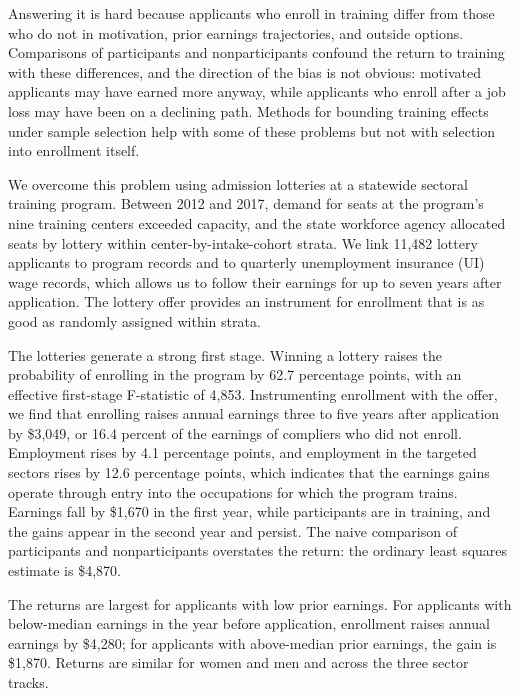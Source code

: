 \documentclass[12pt]{article}
\begin{document}
Answering it is hard because applicants who enroll in training differ from those who do not in motivation, prior earnings trajectories, and outside options. Comparisons of participants and nonparticipants confound the return to training with these differences, and the direction of the bias is not obvious: motivated applicants may have earned more anyway, while applicants who enroll after a job loss may have been on a declining path. Methods for bounding training effects under sample selection \citep{lee2009} help with some of these problems but not with selection into enrollment itself.

We overcome this problem using admission lotteries at a statewide sectoral training program. Between 2012 and 2017, demand for seats at the program's nine training centers exceeded capacity, and the state workforce agency allocated seats by lottery within center-by-intake-cohort strata. We link 11,482 lottery applicants to program records and to quarterly unemployment insurance (UI) wage records, which allows us to follow their earnings for up to seven years after application. The lottery offer provides an instrument for enrollment that is as good as randomly assigned within strata.

The lotteries generate a strong first stage. Winning a lottery raises the probability of enrolling in the program by 62.7 percentage points, with an effective first-stage F-statistic of 4,853. Instrumenting enrollment with the offer, we find that enrolling raises annual earnings three to five years after application by \$3,049, or 16.4 percent of the earnings of compliers who did not enroll. Employment rises by 4.1 percentage points, and employment in the targeted sectors rises by 12.6 percentage points, which indicates that the earnings gains operate through entry into the occupations for which the program trains. Earnings fall by \$1,670 in the first year, while participants are in training, and the gains appear in the second year and persist. The naive comparison of participants and nonparticipants overstates the return: the ordinary least squares estimate is \$4,870.

The returns are largest for applicants with low prior earnings. For applicants with below-median earnings in the year before application, enrollment raises annual earnings by \$4,280; for applicants with above-median prior earnings, the gain is \$1,870. Returns are similar for women and men and across the three sector tracks.
\end{document}
